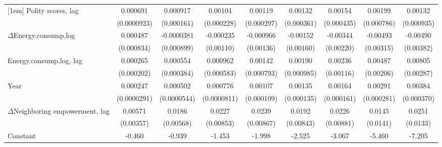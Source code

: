 \begin{table}[htbp]
\begin{tabular}{l*{8}{c}}
[1em]
Polity scores, lag          &    0.000691\sym{***}&    0.000917\sym{***}&     0.00104\sym{***}&     0.00119\sym{***}&     0.00132\sym{***}&     0.00154\sym{***}&     0.00199\sym{**} &     0.00132         \\
                    & (0.0000923)         &  (0.000161)         &  (0.000228)         &  (0.000297)         &  (0.000361)         &  (0.000435)         &  (0.000786)         &  (0.000935)         \\
[1em]
$\Delta$Energy.consump,log            &    0.000487         &  -0.0000381         &   -0.000235         &   -0.000966         &    -0.00152         &    -0.00344         &    -0.00493         &    -0.00490         \\
                    &  (0.000834)         &  (0.000899)         &   (0.00110)         &   (0.00136)         &   (0.00160)         &   (0.00220)         &   (0.00315)         &   (0.00382)         \\
[1em]
Energy.consump,log, lag             &    0.000265         &    0.000554         &    0.000962         &     0.00142\sym{*}  &     0.00190\sym{*}  &     0.00236\sym{**} &     0.00487\sym{**} &     0.00805\sym{***}\\
                    &  (0.000202)         &  (0.000384)         &  (0.000583)         &  (0.000793)         &  (0.000985)         &   (0.00116)         &   (0.00206)         &   (0.00287)         \\
[1em]
Year                &    0.000247\sym{***}&    0.000502\sym{***}&    0.000776\sym{***}&     0.00107\sym{***}&     0.00135\sym{***}&     0.00164\sym{***}&     0.00291\sym{***}&     0.00384\sym{***}\\
                    & (0.0000291)         & (0.0000544)         & (0.0000811)         &  (0.000109)         &  (0.000135)         &  (0.000161)         &  (0.000281)         &  (0.000370)         \\
[1em]
$\Delta$Neighboring empowerment, lag&     0.00571         &      0.0186\sym{***}&      0.0227\sym{***}&      0.0239\sym{***}&      0.0192\sym{**} &      0.0226\sym{**} &      0.0145         &      0.0251\sym{*}  \\
                    &   (0.00357)         &   (0.00568)         &   (0.00853)         &   (0.00867)         &   (0.00843)         &   (0.00881)         &    (0.0141)         &    (0.0133)         \\
[1em]
Constant            &      -0.460\sym{***}&      -0.939\sym{***}&      -1.453\sym{***}&      -1.998\sym{***}&      -2.525\sym{***}&      -3.067\sym{***}&      -5.460\sym{***}&      -7.205\sym{***}\\

\end{tabular}
\end{table}
